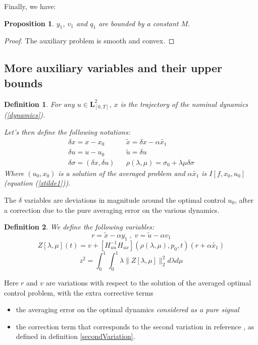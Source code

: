 \documentclass[a4paper,10pt]{article}
\newtheorem{definition}{Definition}
\newtheorem{proposition}{Proposition}
\begin{document}
Finally, we have:
\begin{proposition}\label{AuxProblemBound}
    $y_{1}$, $v_{1}$ and $q_{1}$ are bounded by a constant $M$.
 \end{proposition}
\begin{proof}
    The auxiliary problem is smooth and convex.
\end{proof}

\subsection{More auxiliary variables and their upper 
bounds}\label{auxVariables}
\begin{definition}\label{deltaDefs}
    For any $u \in \mathbf{L}_{[0,T]}^{2}$, $x$ is the trajectory of 
    the nominal dynamics (\ref{dynamics}).
    
    Let's then define the following notations:
    \begin{eqnarray*}
        \delta x = x-x_{0} &  & \tilde{x} = \delta x - \alpha \tilde{x_{1}}\\
       \delta u = u-u_{0} &  & \tilde{u} = \delta u\\
      \delta \sigma = (\delta x,\delta u) & & \rho(\lambda,\mu) = \sigma_{0} + \lambda \mu \delta \sigma 
    \end{eqnarray*}
    Where $(u_{0},x_{0})$ is a solution of the averaged problem and 
    $\alpha \tilde{x_{1}}$ is $I[f,x_{0},u_{0}]$ (equation (\ref{xtilde1})).
\end{definition}
The $\delta$ variables are deviations in magnitude around the optimal 
control $u_{0}$, after a correction due to the pure averaging error on the 
various dynamics.
\begin{definition}
    We define the following variables:
\[
            r=\tilde{x} - \alpha y_{1} \; , \; v=\tilde{u} - \alpha v_{1} 
\]
\[
Z[\lambda,\mu](t) = v        +[H_{uu}^{-1}H_{ux}](\rho(\lambda,\mu),p_{0},t)(r+\alpha \tilde{x_{1}})
\]
\[
        z^{2} = \int_{0}^{1} \int_{0}^{1} \lambda \|Z[\lambda,\mu]\|_{2}^{2} d \lambda d \mu
\]
\end{definition}

Here $r$ and $v$ are variations with respect to the solution of the 
averaged optimal control problem, with the extra corrective terms
\begin{itemize}
	\item  the averaging error on the optimal dynamics {\em 
	considered as a pure signal}

	\item  the correction term that corresponds to the second 
	variation in reference \cite{Bry1}, as defined in definition 
	\ref{secondVariation}.
\end{itemize}
\end{document}
